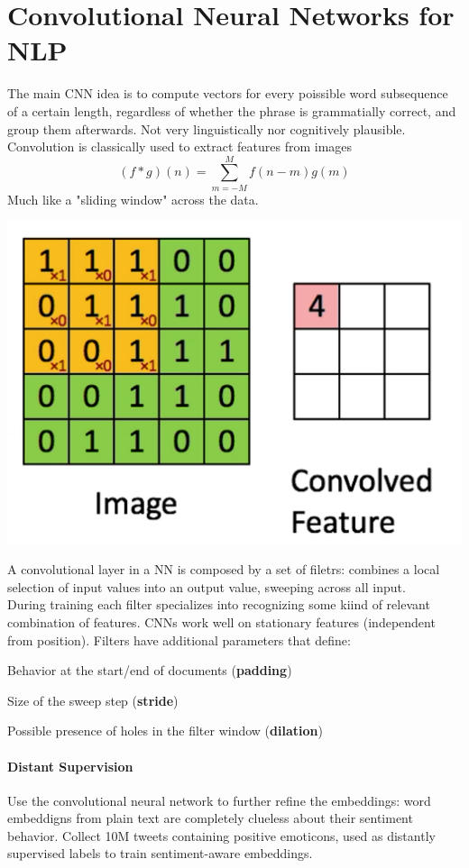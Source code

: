 \documentclass[10pt]{report}
\begin{document}
\section{Convolutional Neural Networks for NLP}
The main CNN idea is to compute vectors for every poissible word subsequence of a certain length, regardless of whether the phrase is grammatially correct, and group them afterwards. Not very linguistically nor cognitively plausible.\\
Convolution is classically used to extract features from images
$$(f * g)(n) = \sum_{m=-M}^M f(n-m)g(m)$$
Much like a "sliding window" across the data.
\begin{center}
	\includegraphics[scale=0.5]{23.png}
\end{center}
A convolutional layer in a NN is composed by a set of filetrs: combines a local selection of input values into an output value, sweeping across all input.\\
During training each filter specializes into recognizing some kiind of relevant combination of features. CNNs work well on stationary features (independent from position). Filters have additional parameters that define:\begin{list}{}{}
	\item Behavior at the start/end of documents (\textbf{padding})
	\item Size of the sweep step (\textbf{stride})
	\item Possible presence of holes in the filter window (\textbf{dilation})
\end{list}
\paragraph{Distant Supervision} Use the convolutional neural network to further refine the embeddings: word embeddigns from plain text are completely clueless about their sentiment behavior. Collect 10M tweets containing positive emoticons, used as distantly supervised labels to train sentiment-aware embeddings.
\end{document}
